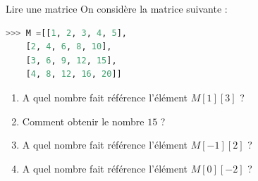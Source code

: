 \documentclass[a4paper,11pt]{article}
\begin{document}
\begin{ExerciceNomme}{Lire une matrice}
On considère la matrice suivante :
\begin{lstlisting}[language=python, caption = {Exercice}]
>>> M =[[1, 2, 3, 4, 5],
 	[2, 4, 6, 8, 10],
 	[3, 6, 9, 12, 15],
	[4, 8, 12, 16, 20]]
\end{lstlisting}
\begin{enumerate}
\item A quel nombre fait référence l'élément $M[1][3]$ ? 
\item Comment obtenir le nombre $15$  ? 
\item A quel nombre fait référence l'élément $M[-1][2]$ ? 
\item A quel nombre fait référence l'élément $M[0][-2]$ ? 
\end{enumerate}
\end{ExerciceNomme}
\end{document}
